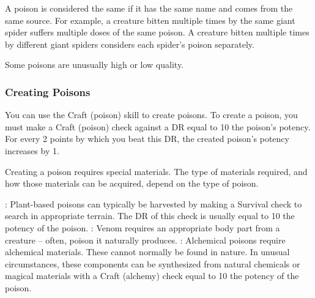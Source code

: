             A poison is considered the same if it has the same name and comes from the same source.
            For example, a creature bitten multiple times by the same giant spider suffers multiple doses of the same poison.
            A creature bitten multiple times by different giant spiders considers each spider's poison separately.

             Some poisons are unusually high or low quality.

        \subsubsection{Creating Poisons}\label{Creating Poisons}

            You can use the Craft (poison) skill to create poisons.
            To create a poison, you must make a Craft (poison) check against a DR equal to 10 \add the poison's potency.
            For every 2 points by which you beat this DR, the created poison's potency increases by 1.

            Creating a poison requires special materials.
            The type of materials required, and how those materials can be acquired, depend on the type of poison.

            \begin{itemize}
                : Plant-based poisons can typically be harvested by making a Survival check to search in appropriate terrain.
                    The DR of this check is usually equal to 10 \add the potency of the poison.
                : Venom requires an appropriate body part from a creature -- often, poison it naturally produces.
                : Alchemical poisons require alchemical materials.
                    These cannot normally be found in nature.
                    In unusual circumstances, these components can be synthesized from natural chemicals or magical materials with a Craft (alchemy) check equal to 10 \add the potency of the poison.
            \end{itemize}
